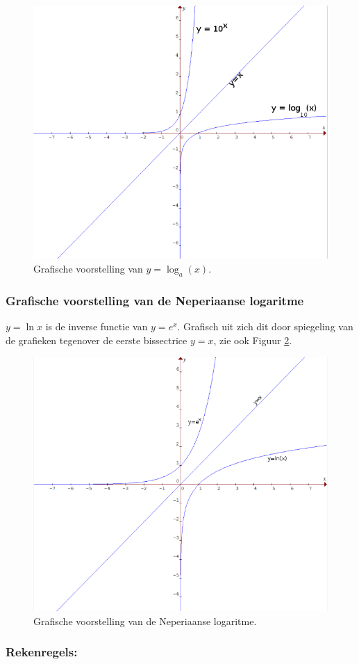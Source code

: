 \begin{figure}
	\centering
	\includegraphics[width=0.5\linewidth]{1_elem_rekenvaardigheden_A/inputs/logFunc1}
	\caption{Grafische voorstelling van $y=\log_{a}(x)$.}
	\label{fig:logfunc1}
\end{figure}


\subsubsection{Grafische voorstelling van de Neperiaanse logaritme}

$y=\ln x$ is de inverse functie van $y=e^x$. Grafisch uit zich dit door spiegeling van de grafieken tegenover de eerste bissectrice $y=x$, zie ook Figuur \ref{fig:logfunc2}.

\begin{figure}
	\centering
	\includegraphics[width=0.5\linewidth]{1_elem_rekenvaardigheden_A/inputs/logFunc2}
	\caption{Grafische voorstelling van de Neperiaanse logaritme.}
	\label{fig:logfunc2}
\end{figure}


\subsubsection{Rekenregels:}




